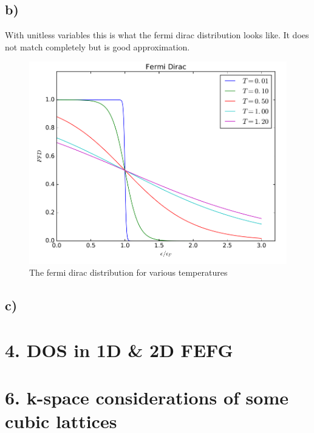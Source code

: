 \documentclass{article}
\begin{document}
\newpage
\subsection*{b)}

With unitless variables this is what the fermi dirac distribution looks like. It does not match completely but is good approximation.

\begin{figure}[H]
	\includegraphics[width = 0.7\linewidth]{fdd.png}
	\centering
	\caption{The fermi dirac distribution for various temperatures}
\end{figure}

\subsection{c)}


\newpage
\section*{4. DOS in 1D \& 2D FEFG}

\newpage
\section*{ 6. k-space considerations of some cubic lattices }
\end{document}
